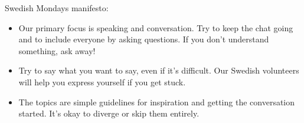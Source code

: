 






Swedish Mondays manifesto:

\begin{itemize}[noitemsep]
    \item Our primary focus is speaking and conversation. Try to keep the chat going and to include everyone by asking questions. If you don't understand something, ask away!
    \item Try to say what you want to say, even if it's difficult. Our Swedish volunteers will help you express yourself if you get stuck.
    \item The topics are simple guidelines for inspiration and getting the conversation started. It's okay to diverge or skip them entirely.
\end{itemize}
